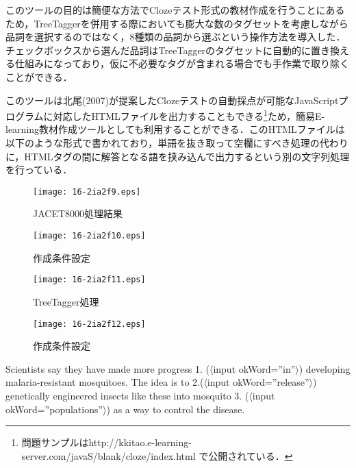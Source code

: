 \documentclass[japanese]{jnlp_1.4}
\begin{document}
このツールの目的は簡便な方法でClozeテスト形式の教材作成を行うことにあるため，TreeTaggerを併用する際においても膨大な数のタグセットを考慮しながら品詞を選択するのではなく，8種類の品詞から選ぶという操作方法を導入した．チェックボックスから選んだ品詞はTreeTaggerのタグセットに自動的に置き換える仕組みになっており，仮に不必要なタグが含まれる場合でも手作業で取り除くことができる．

このツールは北尾(2007)が提案したClozeテストの自動採点が可能なJavaScriptプログラムに対応したHTMLファイルを出力することもできる\footnote{問題サンプルはhttp://kkitao.e-learning-server.com/javaS/blank/cloze/index.html で公開されている．}ため，簡易E-learning教材作成ツールとしても利用することができる．このHTMLファイルは以下のような形式で書かれており，単語を抜き取って空欄にすべき処理の代わりに，HTMLタグの間に解答となる語を挟み込んで出力するという別の文字列処理を行っている．

\begin{figure}[t]
 \begin{minipage}{0.45\textwidth}
  \begin{center}
    \texttt{[image: 16-2ia2f9.eps]}
  \end{center}
  \caption{JACET8000処理結果}
 \end{minipage}
\hfill
 \begin{minipage}{0.45\textwidth}
   \begin{center}
     \texttt{[image: 16-2ia2f10.eps]}
   \end{center}
   \caption{作成条件設定}
 \end{minipage}
\end{figure}

\begin{figure}[t]
 \begin{minipage}{0.45\textwidth}
  \begin{center}
    \texttt{[image: 16-2ia2f11.eps]}
  \end{center}
  \caption{TreeTagger処理}
 \end{minipage}
\hfill
 \begin{minipage}{0.45\textwidth}
   \begin{center}
     \texttt{[image: 16-2ia2f12.eps]}
   \end{center}
   \caption{作成条件設定}
 \end{minipage}
\end{figure}



Scientists say they have made more progress 1. ($\langle$input okWord=''in''$\rangle$) developing malaria-resistant mosquitoes. The idea is to 2.($\langle$input okWord=''release''$\rangle$) genetically engineered insects like these into mosquito 3. ($\langle$input  okWord=''populations''$\rangle$) as a way to control the disease.
\end{document}
